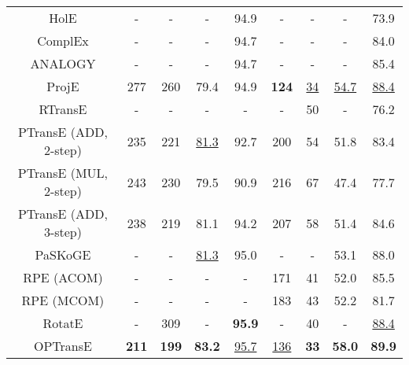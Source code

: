 \documentclass[11pt,a4paper]{article}
\begin{document}
\begin{table*}[t]
\begin{tabular}{|c|c|c|c|c|c|c|c|c|}
HolE                                        & -         & -             & -         & 94.9             & -         & -             & -         & 73.9             \\
ComplEx                                        & -         & -             & -         & 94.7             & -         & -             & -         & 84.0  \\
ANALOGY                                        & -         & -             & -         & 94.7             & -         & -             & -         & 85.4             \\
ProjE                                        & 277         & 260             & 79.4         & 94.9            & \bf{124}         & \underline{34}             & \underline{54.7}         & \underline{88.4}             \\
RTransE                                    & -           & -             & -            & -             & -           & 50              & -            & 76.2             \\
PTransE (ADD, 2-step)                                    & 235         & 221             & \underline{81.3}         & 92.7            & 200         & 54              & 51.8         & 83.4             \\
PTransE (MUL, 2-step)                                    & 243         & 230             & 79.5         & 90.9            & 216         & 67              & 47.4         & 77.7             \\
PTransE (ADD, 3-step)                                    & 238         & 219             & 81.1         & 94.2            & 207         & 58              & 51.4         & 84.6             \\
PaSKoGE                                    & -           & -             & \underline{81.3}            & 95.0             & -           & -              & 53.1            & 88.0             \\
RPE (ACOM)                                       & -         & -             & -         & -             & 171         & 41             & 52.0         & 85.5             \\
RPE (MCOM)                                       & -         & -             & -         & -             & 183         & 43             & 52.2         & 81.7             \\
RotatE      & -         & 309             & -         & \bf95.9  
& -         & 40             & -         & \underline{88.4}                                \\
\hline
OPTransE                                   & \bf211         & \bf199             & \bf83.2         & \underline{95.7}             & \underline{136}         & \bf33              & \bf58.0         & \bf89.9            \\
\hline
\end{tabular}
\end{table*}
\end{document}
